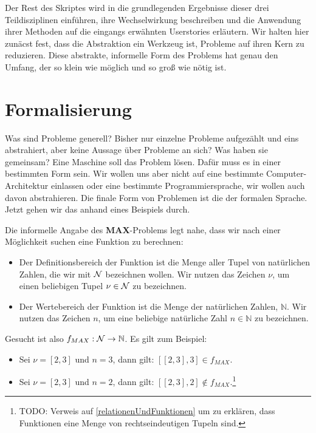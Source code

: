 Der Rest des Skriptes wird in die grundlegenden Ergebnisse dieser drei Teildisziplinen einführen,
ihre Wechselwirkung beschreiben
und die Anwendung ihrer Methoden auf die eingangs erwähnten Userstories erläutern.
Wir halten hier zunäcst fest,
dass die Abstraktion ein Werkzeug ist,
Probleme auf ihren Kern zu reduzieren.
Diese abstrakte, informelle Form des Problems hat genau den Umfang,
der so klein wie möglich und so groß wie nötig ist.



\section{Formalisierung}\label{sec:formalisierung}

Was sind Probleme generell? Bisher nur einzelne Probleme aufgezählt und eins abstrahiert,
aber keine Aussage über Probleme an sich? Was haben sie gemeinsam?
Eine Maschine soll das Problem lösen. Dafür muss es in einer bestimmten Form sein.
Wir wollen uns aber nicht auf eine bestimmte Computer-Architektur einlassen
oder eine bestimmte Programmiersprache, wir wollen auch davon abstrahieren.
Die finale Form von Problemen ist die der formalen Sprache.
Jetzt gehen wir das anhand eines Beispiels durch.

Die informelle Angabe des \textbf{MAX}-Problems legt nahe, dass wir nach einer Möglichkeit suchen
eine Funktion zu berechnen:
\begin{itemize}
    \item Der Definitionsbereich der Funktion ist die Menge aller Tupel von natürlichen Zahlen,
        die wir mit $\cal{N}$ bezeichnen wollen.
        Wir nutzen das Zeichen $\nu$,
        um einen beliebigen Tupel $\nu \in \cal{N}$ zu bezeichnen.
    \item Der Wertebereich der Funktion ist die Menge der natürlichen Zahlen, $\mathbb{N}$.
        Wir nutzen das Zeichen $n$,
        um eine beliebige natürliche Zahl $n \in \mathbb{N}$ zu bezeichnen.
\end{itemize}
Gesucht ist also $f_{MAX}: \cal{N} \rightarrow \mathbb{N}$.
Es gilt zum Beispiel:
\begin{itemize}
    \item Sei $\nu = [2,3]$ und $n = 3$,
        dann gilt: $[[2,3],3] \in f_{MAX}$.
    \item Sei $\nu = [2,3]$ und $n = 2$,
        dann gilt: $[[2,3],2] \notin f_{MAX}$.\footnote{
            TODO: Verweis auf \ref{relationenUndFunktionen} um zu erklären,
            dass Funktionen eine Menge von rechtseindeutigen Tupeln sind.}
\end{itemize}

